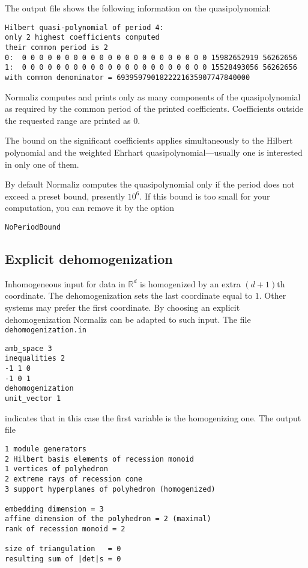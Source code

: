 \documentclass[12pt,a4paper]{scrartcl}
\theoremstyle{definition}
\def\RR{{\mathbb R}}
\begin{document}
{The output file shows the following information on the quasipolynomial:
\begin{Verbatim}
Hilbert quasi-polynomial of period 4:
only 2 highest coefficients computed
their common period is 2
0:  0 0 0 0 0 0 0 0 0 0 0 0 0 0 0 0 0 0 0 0 0 0 15982652919 56262656
1:  0 0 0 0 0 0 0 0 0 0 0 0 0 0 0 0 0 0 0 0 0 0 15528493056 56262656
with common denominator = 6939597901822221635907747840000
\end{Verbatim}
Normaliz computes and prints only as many components of the quasipolynomial as required by the common period of the printed coefficients. Coefficients outside the requested range are printed as $0$.

The bound on the significant coefficients applies simultaneously to the Hilbert polynomial and the weighted Ehrhart quasipolynomial---usually one is interested in only one of them.

By default Normaliz computes the quasipolynomial only if the period does not exceed a preset bound, presently $10^6$. If this bound is too small for your computation, you can remove it by the option
\begin{Verbatim}
NoPeriodBound
\end{Verbatim}



\subsection{Explicit dehomogenization}\label{dehom_ex}
Inhomogeneous input for data in $\RR^{d}$ is homogenized by an extra $(d+1)$th coordinate. The dehomogenization sets the last coordinate equal to $1$. Other systems may prefer the first coordinate. By choosing an explicit dehomogenization Normaliz can be adapted to such input. The file \verb|dehomogenization.in|
\begin{Verbatim}
amb_space 3
inequalities 2
-1 1 0
-1 0 1
dehomogenization
unit_vector 1
\end{Verbatim}
indicates that in this case the first variable is the homogenizing one. The output file
\begin{Verbatim}
1 module generators
2 Hilbert basis elements of recession monoid
1 vertices of polyhedron
2 extreme rays of recession cone
3 support hyperplanes of polyhedron (homogenized)

embedding dimension = 3
affine dimension of the polyhedron = 2 (maximal)
rank of recession monoid = 2

size of triangulation   = 0
resulting sum of |det|s = 0


\end{Verbatim}}
\end{document}
